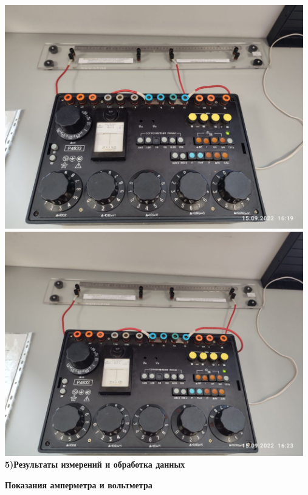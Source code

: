 \documentclass[a4paper, 12pt]{article}
\begin{document}
\includegraphics[width=13cm]{A (9).jpg}\\
\includegraphics[width=13cm]{A (10).jpg}\\

\vspace{2em}\textbf{5)Результаты измерений и обработка данных}\\
\begin{center}
	\textbf{Показания амперметра и вольтметра}
\end{center}
\end{document}
